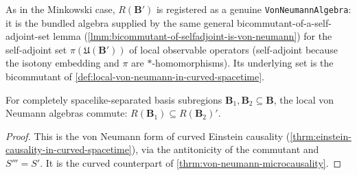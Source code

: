 \begin{definition}
    \label{def:local-von-neumann-algebra-in-curved-spacetime}
    \leanok
    As in the Minkowski case, $R(\mathbf{B}')$ is registered as a genuine \texttt{VonNeumannAlgebra}: it is the bundled algebra supplied by the same general bicommutant-of-a-self-adjoint-set lemma (\ref{lmm:bicommutant-of-selfadjoint-is-von-neumann}) for the self-adjoint set $\pi(\mathfrak{U}(\mathbf{B}'))$ of local observable operators (self-adjoint because the isotony embedding and $\pi$ are $*$-homomorphisms). Its underlying set is the bicommutant of \ref{def:local-von-neumann-in-curved-spacetime}.
\end{definition}

\begin{theorem}
    \label{thrm:von-neumann-microcausality-in-curved-spacetime}
    \leanok
    For completely spacelike-separated basis subregions $\mathbf{B}_1, \mathbf{B}_2 \subseteq \mathbf{B}$, the local von Neumann algebras commute: $R(\mathbf{B}_1) \subseteq R(\mathbf{B}_2)'$.
\end{theorem}
\begin{proof}
    \leanok
    This is the von Neumann form of curved Einstein causality (\ref{thrm:einstein-causality-in-curved-spacetime}), via the antitonicity of the commutant and $S''' = S'$. It is the curved counterpart of \ref{thrm:von-neumann-microcausality}.
\end{proof}

